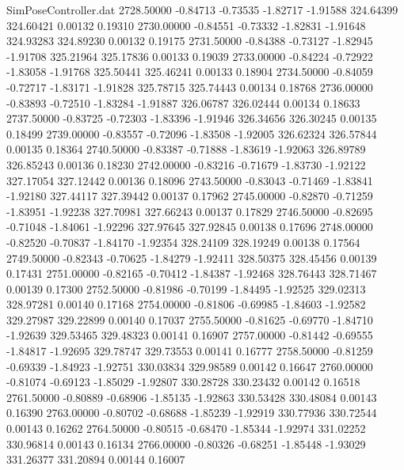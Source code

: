 \begin{filecontents}{SimPoseController.dat}
2728.50000   -0.84713   -0.73535    -1.82717   -1.91588  324.64399  324.60421    0.00132    0.19310
2730.00000   -0.84551   -0.73332    -1.82831   -1.91648  324.93283  324.89230    0.00132    0.19175
2731.50000   -0.84388   -0.73127    -1.82945   -1.91708  325.21964  325.17836    0.00133    0.19039
2733.00000   -0.84224   -0.72922    -1.83058   -1.91768  325.50441  325.46241    0.00133    0.18904
2734.50000   -0.84059   -0.72717    -1.83171   -1.91828  325.78715  325.74443    0.00134    0.18768
2736.00000   -0.83893   -0.72510    -1.83284   -1.91887  326.06787  326.02444    0.00134    0.18633
2737.50000   -0.83725   -0.72303    -1.83396   -1.91946  326.34656  326.30245    0.00135    0.18499
2739.00000   -0.83557   -0.72096    -1.83508   -1.92005  326.62324  326.57844    0.00135    0.18364
2740.50000   -0.83387   -0.71888    -1.83619   -1.92063  326.89789  326.85243    0.00136    0.18230
2742.00000   -0.83216   -0.71679    -1.83730   -1.92122  327.17054  327.12442    0.00136    0.18096
2743.50000   -0.83043   -0.71469    -1.83841   -1.92180  327.44117  327.39442    0.00137    0.17962
2745.00000   -0.82870   -0.71259    -1.83951   -1.92238  327.70981  327.66243    0.00137    0.17829
2746.50000   -0.82695   -0.71048    -1.84061   -1.92296  327.97645  327.92845    0.00138    0.17696
2748.00000   -0.82520   -0.70837    -1.84170   -1.92354  328.24109  328.19249    0.00138    0.17564
2749.50000   -0.82343   -0.70625    -1.84279   -1.92411  328.50375  328.45456    0.00139    0.17431
2751.00000   -0.82165   -0.70412    -1.84387   -1.92468  328.76443  328.71467    0.00139    0.17300
2752.50000   -0.81986   -0.70199    -1.84495   -1.92525  329.02313  328.97281    0.00140    0.17168
2754.00000   -0.81806   -0.69985    -1.84603   -1.92582  329.27987  329.22899    0.00140    0.17037
2755.50000   -0.81625   -0.69770    -1.84710   -1.92639  329.53465  329.48323    0.00141    0.16907
2757.00000   -0.81442   -0.69555    -1.84817   -1.92695  329.78747  329.73553    0.00141    0.16777
2758.50000   -0.81259   -0.69339    -1.84923   -1.92751  330.03834  329.98589    0.00142    0.16647
2760.00000   -0.81074   -0.69123    -1.85029   -1.92807  330.28728  330.23432    0.00142    0.16518
2761.50000   -0.80889   -0.68906    -1.85135   -1.92863  330.53428  330.48084    0.00143    0.16390
2763.00000   -0.80702   -0.68688    -1.85239   -1.92919  330.77936  330.72544    0.00143    0.16262
2764.50000   -0.80515   -0.68470    -1.85344   -1.92974  331.02252  330.96814    0.00143    0.16134
2766.00000   -0.80326   -0.68251    -1.85448   -1.93029  331.26377  331.20894    0.00144    0.16007

\end{filecontents}
